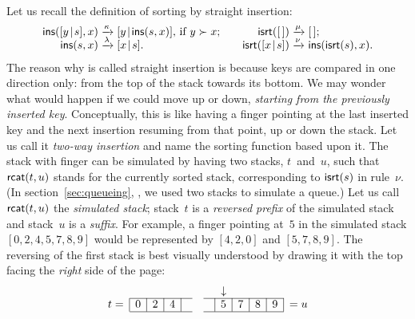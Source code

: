 Let us recall the definition of sorting by straight insertion:
\begin{equation*}
\begin{array}{@{}r@{\;}l@{\;}l@{\qquad}r@{\;}l@{\;}l@{}}
  \fun{ins}(\cons{y}{s},x)
& \xrightarrow{\smash{\kappa}}
& \cons{y}{\fun{ins}(s,x)}, \,\text{if \(y \succ x\)};
& \fun{isrt}(\el)
& \xrightarrow{\smash{\mu}}
& \el;\\
  \fun{ins}(s,x)
& \xrightarrow{\smash{\lambda}}
& \cons{x}{s}.
& \fun{isrt}(\cons{x}{s})
& \xrightarrow{\smash{\nu}}
& \fun{ins}(\fun{isrt}(s),x).
\end{array}
\end{equation*}
The reason why  is called straight
insertion is because keys are compared in one direction only: from the
top of the stack towards its bottom. We may wonder what would happen
if we could move up or down, \emph{starting from the previously
  inserted key}. Conceptually, this is like having a finger pointing
at the last inserted key and the next insertion resuming from that
point, up or down the stack. Let us call it \emph{two\hyp{}way
  insertion} and name  the sorting
function based upon it. The stack with finger can be simulated by
having two stacks, \(t\)~and~\(u\), such that
\(\textsf{rcat}(t,u)\) stands for the currently
sorted stack, corresponding to
\(\textsf{isrt}(s)\) in rule~\(\nu\). (In
section~\ref{sec:queueing}, , we used two
stacks to simulate a queue.) Let us call
\(\textsf{rcat}(t,u)\) the \emph{simulated
  stack}; stack~\(t\) is a
\emph{reversed prefix} of the simulated
stack and stack~\(u\) is a \emph{suffix}. For
example, a finger pointing at~\(5\) in the simulated stack
\([0,2,4,5,7,8,9]\) would be represented by \([4,2,0]\) and
\([5,7,8,9]\). The reversing of the first stack is best visually
understood by drawing it with the top facing the \emph{right} side of
the page:
\begin{equation*}
\begin{array}{@{}r|c|c|c|ccc|c|c|c|c|l@{}}
  \multicolumn{1}{c}{} & \multicolumn{1}{c}{} & \multicolumn{1}{c}{}
& \multicolumn{1}{c}{} & \multicolumn{1}{c}{} & \multicolumn{1}{c}{}
& \multicolumn{1}{c}{} & \multicolumn{1}{c}{\downarrow}\\
\cline{2-5}\cline{7-11}
t = & 0 & 2 & 4 & & & & 5 & 7 & 8 & 9 & = u\\
\cline{2-5}\cline{7-11}
\end{array}
\end{equation*}
